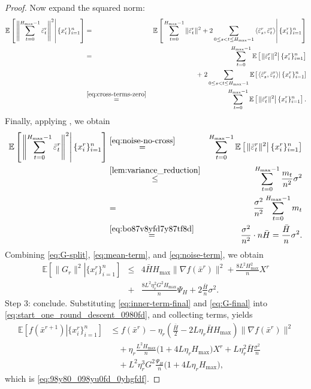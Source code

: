 \documentclass[10pt,a4paper]{amsart}
\newcommand{\ExpCond}[2]{{\mathbb{E}}\left[\left.#1\right\vert#2\right]}
\newcommand{\anglebr}[1]{\left\langle#1\right\rangle} %
\newcommand{\inner}[2]{\anglebr{#1, #2}}
\providecommand{\paragraph}{}
\begin{document}
\begin{proof}
Now expand the squared norm:
\begin{eqnarray}
\ExpCond{ \left\|\sum_{t=0}^{H_{\max}-1}\bar\varepsilon_t^r\right\|^2 }{ \{x_i^r\}_{i=1}^n }
&=&
\ExpCond{
\sum_{t=0}^{H_{\max}-1}\|\bar\varepsilon_t^r\|^2
+
2\sum_{0\le s<t\le H_{\max}-1}\inner{\bar\varepsilon_s^r}{\bar\varepsilon_t^r}
}{ \{x_i^r\}_{i=1}^n }
\notag\\
&=&
\sum_{t=0}^{H_{\max}-1}
\ExpCond{\|\bar\varepsilon_t^r\|^2}{ \{x_i^r\}_{i=1}^n } \notag\\
&&\; + \;
2\sum_{0\le s<t\le H_{\max}-1}
\ExpCond{\inner{\bar\varepsilon_s^r}{\bar\varepsilon_t^r}}{ \{x_i^r\}_{i=1}^n }
\notag\\
&\overset{\eqref{eq:cross-terms-zero}}{=}&
\sum_{t=0}^{H_{\max}-1}
\ExpCond{\|\bar\varepsilon_t^r\|^2}{ \{x_i^r\}_{i=1}^n }.
\label{eq:noise-no-cross}
\end{eqnarray}
Finally, applying , we obtain
\begin{eqnarray}
\ExpCond{ \left\|\sum_{t=0}^{H_{\max}-1}\bar\varepsilon_t^r\right\|^2 }{ \{x_i^r\}_{i=1}^n }
&\overset{\eqref{eq:noise-no-cross}}{=}&
\sum_{t=0}^{H_{\max}-1}
\ExpCond{\|\bar\varepsilon_t^r\|^2}{ \{x_i^r\}_{i=1}^n }
\notag\\
&\overset{\Cref{lem:variance_reduction}}{\leq}& \sum_{t=0}^{H_{\max}-1}
\frac{m_t}{n^2}\sigma^2
\notag\\
&=&
\frac{\sigma^2}{n^2}\sum_{t=0}^{H_{\max}-1} m_t
\notag\\
&\overset{\eqref{eq:bo87v8yfd7y87tf8d}}{=}&
\frac{\sigma^2}{n^2}\cdot n\bar H
=
\frac{\bar H}{n}\sigma^2.
\label{eq:noise-term}
\end{eqnarray}
% 
% 
Combining \eqref{eq:G-split}, \eqref{eq:mean-term}, and \eqref{eq:noise-term}, we obtain
\begin{eqnarray}
\ExpCond{ \|G_r\|^2 }{ \{x_i^r\}_{i=1}^n }
&\leq&
4\bar H H_{\max}\|\nabla f(\bar x^r)\|^2
+
\frac{8L^2H_{\max}^2}{n}X^r \\
&+& 
\frac{8L^2\eta_r^2G^2H_{\max}}{n}\Psi_H
+
2\frac{\bar H}{n}\sigma^2.
\label{eq:G-final}
\end{eqnarray}
% 
\paragraph{Step 3: conclude.}
Substituting \eqref{eq:inner-term-final} and \eqref{eq:G-final} into \eqref{eq:start_one_round_descent_0980fd}, and collecting terms, yields
\begin{align*}
\ExpCond{ f(\bar x^{r+1}) }{ \{x_i^r\}_{i=1}^n }
&\leq
f(\bar x^r)
-
\eta_r\left(\frac{\bar H}{2}-2L\eta_r \bar H H_{\max}\right)\|\nabla f(\bar x^r)\|^2
\\
&\quad
+
\eta_r\frac{L^2H_{\max}}{n}\bigl(1+4L\eta_r H_{\max}\bigr)X^{r}
+
L\eta_r^2\bar H\frac{\sigma^2}{n}
\\
&\quad
+
L^2\eta_r^3G^2\frac{\Psi_H}{n}\bigl(1+4L\eta_r H_{\max}\bigr),
\end{align*}
which is \eqref{eq:98y80_098yu0fd_0yhgfdf}.
\end{proof}
\end{document}
